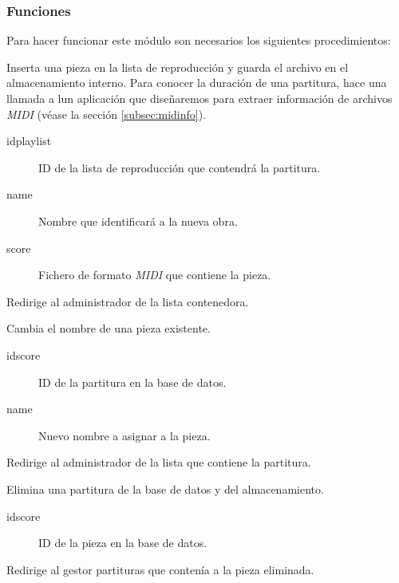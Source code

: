 \smallskip

\subsubsection{Funciones}

Para hacer funcionar este módulo son necesarios los siguientes procedimientos:

\begin{description}[style=nextline]
	\item[new\_score (idplaylist, name, score)]
	Inserta una pieza en la lista de reproducción y guarda el archivo en el almacenamiento interno. Para conocer la duración de una partitura, hace una llamada a lun aplicación que diseñaremos para extraer información de archivos \textit{MIDI} (véase la sección \ref{subsec:midinfo}).
	
	\begin{description}
		\item[idplaylist] ID de la lista de reproducción que contendrá la partitura.
		\item[name] Nombre que identificará a la nueva obra.
		\item[score] Fichero de formato \textit{MIDI} que contiene la pieza.
	\end{description}
	
	Redirige al administrador de la lista contenedora.
	
	\item[rename\_score (idscore, name)]
	Cambia el nombre de una pieza existente.
	
	\begin{description}
		\item[idscore] ID de la partitura en la base de datos.
		\item[name] Nuevo nombre a asignar a la pieza.
	\end{description}
	
	Redirige al administrador de la lista que contiene la partitura.
	
	\item[delete\_score (idscore)]
	Elimina una partitura de la base de datos y del almacenamiento.
	
	\begin{description}
		\item[idscore] ID de la pieza en la base de datos.
	\end{description}
	
	Redirige al gestor partituras que contenía a la pieza eliminada.
	
\end{description}

